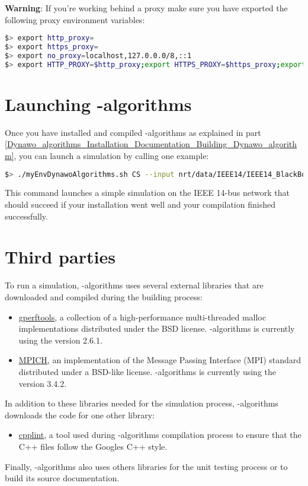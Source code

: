 \documentclass[a4paper, 12pt]{report}
\begin{document}
\textbf{Warning}: If you're working behind a proxy make sure you have exported the following proxy environment variables:

\begin{lstlisting}[language=bash]
$> export http_proxy=
$> export https_proxy=
$> export no_proxy=localhost,127.0.0.0/8,::1
$> export HTTP_PROXY=$http_proxy;export HTTPS_PROXY=$https_proxy;export NO_PROXY=$no_proxy;
\end{lstlisting}

\section[Launching Dynawo-algorithms]{Launching \Dynawo-algorithms}

Once you have installed and compiled \Dynawo-algorithms as explained in part \ref{Dynawo_algorithms_Installation_Documentation_Building_Dynawo_algorithm}, 
you can launch a simulation by calling one example:

\begin{lstlisting}[language=bash, breaklines=true, breakatwhitespace=false]
$> ./myEnvDynawoAlgorithms.sh CS --input nrt/data/IEEE14/IEEE14_BlackBoxModels/IEEE14.jobs
\end{lstlisting}

This command launches a simple simulation on the IEEE 14-bus network that should succeed if your installation went well and your compilation finished successfully.

\section{Third parties}

To run a simulation, \Dynawo-algorithms uses several external libraries that are downloaded and compiled during the building process:
\begin{itemize}
\item \href{https://github.com/gperftools/gperftools} {\underline{gperftools}}, a collection of a high-performance multi-threaded
malloc implementations distributed under the BSD license. \Dynawo-algorithms is currently using the version 2.6.1.

\item \href{https://www.mpich.org/}{\underline{MPICH}}, an implementation of the Message Passing Interface (MPI) standard distributed under a BSD-like license. 
\Dynawo-algorithms is currently using the version 3.4.2.
\end{itemize}

In addition to these libraries needed for the simulation process, \Dynawo-algorithms downloads the code for one other library:
\begin{itemize}
\item \href{https://github.com/google/styleguide/tree/gh-pages/cpplint}{\underline{cpplint}}, 
a tool used during \Dynawo-algorithms compilation process to ensure that the C++ files follow the Google\textquotesingle s C++ style.
\end{itemize}

Finally, \Dynawo-algorithms also uses others libraries for the unit testing process or to build its source documentation. 
\end{document}
